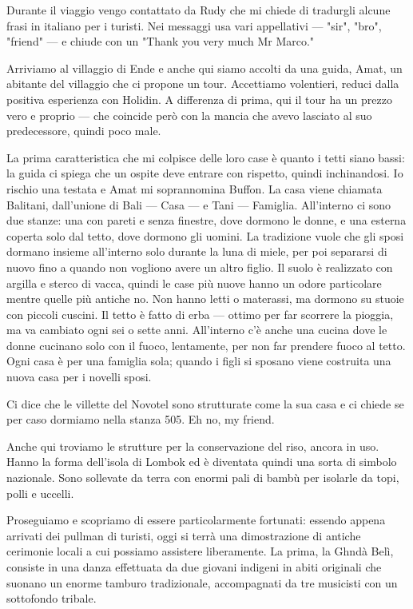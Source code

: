 Durante il viaggio vengo contattato da Rudy che mi chiede di tradurgli alcune frasi in italiano per i turisti. Nei messaggi usa vari appellativi — "sir", "bro", "friend" — e chiude con un "Thank you very much Mr Marco."

Arriviamo al villaggio di Ende e anche qui siamo accolti da una guida, Amat, un abitante del villaggio che ci propone un tour. Accettiamo volentieri, reduci dalla positiva esperienza con Holidin. A differenza di prima, qui il tour ha un prezzo vero e proprio — che coincide però con la mancia che avevo lasciato al suo predecessore, quindi poco male.

La prima caratteristica che mi colpisce delle loro case è quanto i tetti siano bassi: la guida ci spiega che un ospite deve entrare con rispetto, quindi inchinandosi. Io rischio una testata e Amat mi soprannomina Buffon. La casa viene chiamata Balitani, dall'unione di Bali — Casa — e Tani — Famiglia. All'interno ci sono due stanze: una con pareti e senza finestre, dove dormono le donne, e una esterna coperta solo dal tetto, dove dormono gli uomini. La tradizione vuole che gli sposi dormano insieme all'interno solo durante la luna di miele, per poi separarsi di nuovo fino a quando non vogliono avere un altro figlio. Il suolo è realizzato con argilla e sterco di vacca, quindi le case più nuove hanno un odore particolare mentre quelle più antiche no. Non hanno letti o materassi, ma dormono su stuoie con piccoli cuscini. Il tetto è fatto di erba — ottimo per far scorrere la pioggia, ma va cambiato ogni sei o sette anni. All'interno c'è anche una cucina dove le donne cucinano solo con il fuoco, lentamente, per non far prendere fuoco al tetto. Ogni casa è per una famiglia sola; quando i figli si sposano viene costruita una nuova casa per i novelli sposi.

Ci dice che le villette del Novotel sono strutturate come la sua casa e ci chiede se per caso dormiamo nella stanza 505. Eh no, my friend.

Anche qui troviamo le strutture per la conservazione del riso, ancora in uso. Hanno la forma dell'isola di Lombok ed è diventata quindi una sorta di simbolo nazionale. Sono sollevate da terra con enormi pali di bambù per isolarle da topi, polli e uccelli.

Proseguiamo e scopriamo di essere particolarmente fortunati: essendo appena arrivati dei pullman di turisti, oggi si terrà una dimostrazione di antiche cerimonie locali a cui possiamo assistere liberamente. La prima, la Ghndà Belì, consiste in una danza effettuata da due giovani indigeni in abiti originali che suonano un enorme tamburo tradizionale, accompagnati da tre musicisti con un sottofondo tribale.

